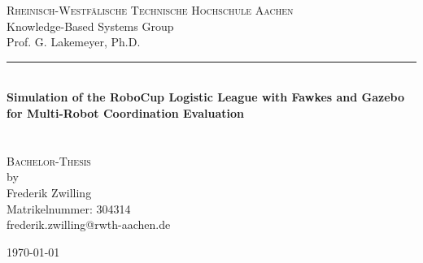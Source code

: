 \begin{titlepage}
  
  \begin{center}
    
    \Large
    \textsc{Rheinisch-Westfälische Technische Hochschule Aachen}\\
    Knowledge-Based Systems Group\\
    Prof. G. Lakemeyer, Ph.D.\\
    
    \vspace{4cm}
    

    \hrule \\
    [0.4cm]
           {
             \Huge 
             \bfseries
             Simulation of the RoboCup Logistic League with Fawkes and Gazebo for Multi-Robot Coordination Evaluation\\
           }\\
   [0.4cm]
   \hline \\
   [1.5cm]
   
    \textsc{Bachelor-Thesis}\\
    by\\ 
    [0.4cm]
    \large Frederik Zwilling\\
    \normalsize
    Matrikelnummer: 304314\\
    frederik.zwilling@rwth-aachen.de\\

    \vspace{8cm}
    
    \today
  \end{center}

\end{titlepage}
